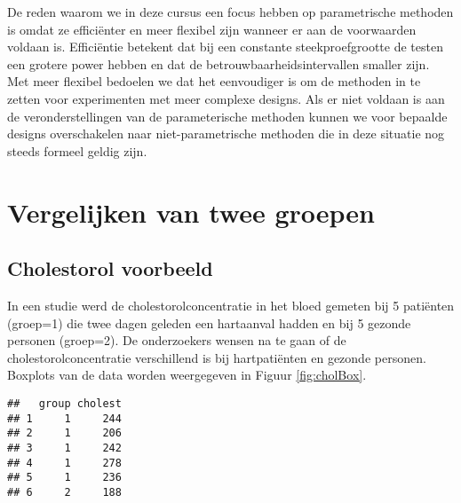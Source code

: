\documentclass[12pt,dutch,coursenotes]{book}
\newenvironment{Shaded}{\begin{snugshade}}{\end{snugshade}}
\newcommand{\KeywordTok}[1]{\textcolor[rgb]{0.13,0.29,0.53}{\textbf{#1}}}
\newcommand{\DataTypeTok}[1]{\textcolor[rgb]{0.13,0.29,0.53}{#1}}
\newcommand{\StringTok}[1]{\textcolor[rgb]{0.31,0.60,0.02}{#1}}
\newcommand{\OtherTok}[1]{\textcolor[rgb]{0.56,0.35,0.01}{#1}}
\newcommand{\OperatorTok}[1]{\textcolor[rgb]{0.81,0.36,0.00}{\textbf{#1}}}
\newcommand{\NormalTok}[1]{#1}
\theoremstyle{definition}
\theoremstyle{definition}
\theoremstyle{definition}
\theoremstyle{remark}
\begin{document}
De reden waarom we in deze cursus een focus hebben op parametrische
methoden is omdat ze efficiënter en meer flexibel zijn wanneer er aan de
voorwaarden voldaan is. Efficiëntie betekent dat bij een constante
steekproefgrootte de testen een grotere power hebben en dat de
betrouwbaarheidsintervallen smaller zijn. Met meer flexibel bedoelen we
dat het eenvoudiger is om de methoden in te zetten voor experimenten met
meer complexe designs. Als er niet voldaan is aan de veronderstellingen
van de parameterische methoden kunnen we voor bepaalde designs
overschakelen naar niet-parametrische methoden die in deze situatie nog
steeds formeel geldig zijn.

\section{Vergelijken van twee
groepen}\label{vergelijken-van-twee-groepen}

\subsection{Cholestorol voorbeeld}\label{cholestorol-voorbeeld}

In een studie werd de cholestorolconcentratie in het bloed gemeten bij 5
patiënten (groep=1) die twee dagen geleden een hartaanval hadden en bij
5 gezonde personen (groep=2). De onderzoekers wensen na te gaan of de
cholestorolconcentratie verschillend is bij hartpatiënten en gezonde
personen. Boxplots van de data worden weergegeven in Figuur
\ref{fig:cholBox}.

\begin{Shaded}
\end{Shaded}

\begin{verbatim}
##   group cholest
## 1     1     244
## 2     1     206
## 3     1     242
## 4     1     278
## 5     1     236
## 6     2     188
\end{verbatim}
\end{document}

